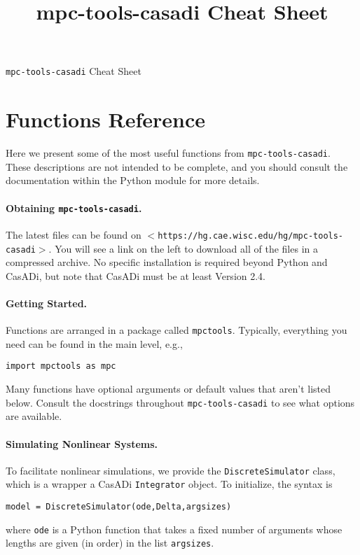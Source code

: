 \documentclass{article}
\title{mpc-tools-casadi Cheat Sheet}
\newcommand{\smallurl}[2][\scriptsize]{\texttt{#1$<$#2$>$}}
\newcommand{\casadi}{CasADi}
\begin{document}
\begin{center}
    \LARGE \texttt{mpc-tools-casadi} Cheat Sheet
\end{center}

\section{Functions Reference}

Here we present some of the most useful functions from \texttt{mpc-tools-casadi}.
These descriptions are not intended to be complete, and you should consult the documentation within the Python module for more details.

\begin{multicols}{2}

\paragraph*{Obtaining \texttt{mpc-tools-casadi}.}

The latest files can be found on \smallurl{https://hg.cae.wisc.edu/hg/mpc-tools-casadi}.
You will see a link on the left to download all of the files in a compressed archive.
No specific installation is required beyond Python and \casadi{}, but note that \casadi{} must be at least Version 2.4.

\paragraph*{Getting Started.}

Functions are arranged in a package called \texttt{mpctools}.
Typically, everything you need can be found in the main level, e.g.,
%
\begin{lstlisting}[frame=L]
import mpctools as mpc
\end{lstlisting}

Many functions have optional arguments or default values that aren't listed below.
Consult the docstrings throughout \texttt{mpc-tools-casadi} to see what options are available.

\paragraph*{Simulating Nonlinear Systems.}

To facilitate nonlinear simulations, we provide the \texttt{DiscreteSimulator} class, which is a wrapper a \casadi{} \texttt{Integrator} object.
To initialize, the syntax is
%
\begin{lstlisting}[frame=L]
model = DiscreteSimulator(ode,Delta,argsizes)
\end{lstlisting}
%
where \texttt{ode} is a Python function that takes a fixed number of arguments whose lengths are given (in order) in the list \texttt{argsizes}.


\end{multicols}
\end{document}
